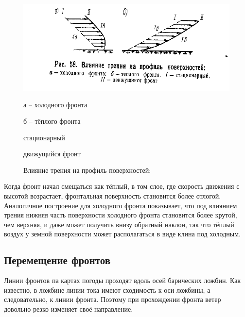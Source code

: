 \documentclass[a4paper, 12pt, twoside, final, book, russian, fittopage, cyremdash, openright]{ncc}
\begin{document}
\begin{figure}[htb]
   \centering
   \includegraphics[scale=1]{12_friction_surface_profile.pdf}
   \caption[Влияние трения на профиль поверхностей]{Влияние трения на профиль поверхностей:}
   \label{fig:firction_sufrace_profile}
   \small
   \begin{enumerate*}[itemjoin={{; }}, label={}, after={{; }}]
   \item а \--- холодного фронта
   \item б \--- тёплого фронта
   \end{enumerate*}
   \begin{enumerate*}[itemjoin={{; }}, label={\Roman* \--- }]
   \item стационарный
   \item движущийся фронт
   \end{enumerate*}
\end{figure}

Когда фронт начал смещаться как тёплый, в том слое, где скорость
движения с высотой возрастает, фронтальная поверхность становится
более отлогой. Аналогичное построение для холодного фронта показывает,
что под влиянием трения нижняя часть поверхности холодного фронта
становится более крутой, чем верхняя, и даже может получить внизу
обратный наклон, так что тёплый воздух у земной поверхности может
располагаться в виде клина под холодным.

\subsection{Перемещение фронтов}
\label{sec:fronts_moving}

Линии фронтов па картах погоды проходят вдоль осей барических
ложбин. Как известно, в ложбине линии тока имеют сходимость к оси
ложбины, а следовательно, к линии фронта. Поэтому при прохождении
фронта ветер довольно резко изменяет своё направление.
\end{document}
